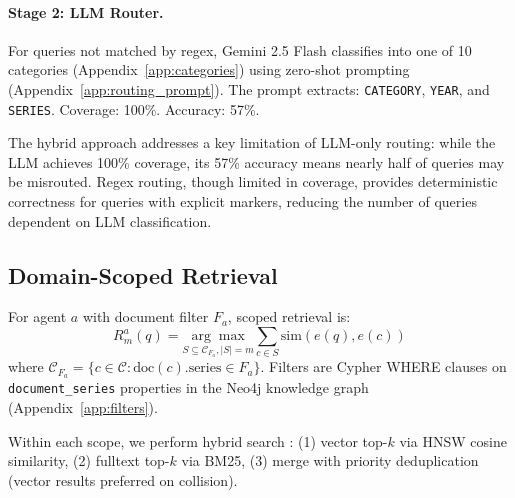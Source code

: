 \documentclass{article}
\begin{document}
\paragraph{Stage 2: LLM Router.} For queries not matched by regex, Gemini 2.5 Flash classifies into one of 10 categories (Appendix~\ref{app:categories}) using zero-shot prompting (Appendix~\ref{app:routing_prompt}). The prompt extracts: \texttt{CATEGORY}, \texttt{YEAR}, and \texttt{SERIES}. Coverage: 100\%. Accuracy: 57\%.


The hybrid approach addresses a key limitation of LLM-only routing: while the LLM achieves 100\% coverage, its 57\% accuracy means nearly half of queries may be misrouted. Regex routing, though limited in coverage, provides deterministic correctness for queries with explicit markers, reducing the number of queries dependent on LLM classification.

\subsection{Domain-Scoped Retrieval}
\label{sec:scoped_search}

For agent $a$ with document filter $F_a$, scoped retrieval is:
\begin{equation}
R_m^a(q) = \underset{S \subseteq \mathcal{C}_{F_a}, |S|=m}{\arg\max} \sum_{c \in S} \text{sim}(e(q), e(c))
\end{equation}
where $\mathcal{C}_{F_a} = \{c \in \mathcal{C} : \text{doc}(c).\text{series} \in F_a\}$. Filters are Cypher WHERE clauses on \texttt{document\_series} properties in the Neo4j knowledge graph (Appendix~\ref{app:filters}).

Within each scope, we perform hybrid search \cite{sawarkar2024blended}: (1) vector top-$k$ via HNSW cosine similarity, (2) fulltext top-$k$ via BM25, (3) merge with priority deduplication (vector results preferred on collision).
\end{document}
